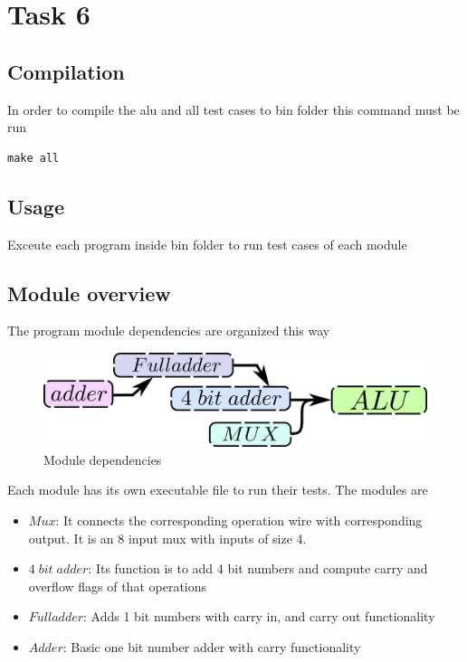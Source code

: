 \newpage
\section*{Task 6}

\subsection*{Compilation}
In order to compile the alu and all test cases to bin folder this command must be run
\begin{lstlisting}
make all
\end{lstlisting}

\subsection*{Usage}
Exceute each program inside bin folder to run test cases of each module

\subsection*{Module overview}
The program module dependencies are organized this way
\begin{figure}[H]
  \begin{centering}
  \includegraphics[scale=1]{data/modulos.png}
  \par\end{centering}
  \caption{Module dependencies}
\end{figure}
Each module has its own executable file to run their tests. The modules are

\begin{itemize}
  \item $Mux$: It connects the corresponding operation wire with corresponding output. It is an 8 input mux with inputs of size 4.
  \item $4\;bit\;adder$: Its function is to add 4 bit numbers and compute carry and overflow flags of that operations
  \item $Fulladder$: Adds 1 bit numbers with carry in, and carry out functionality
  \item $Adder $: Basic one bit number adder with carry functionality
\end{itemize}

